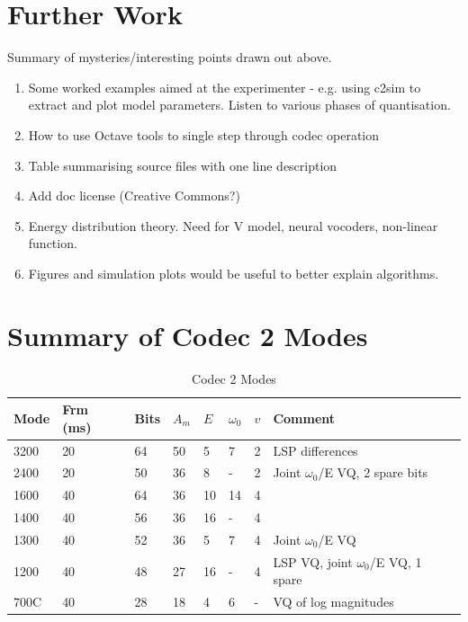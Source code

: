 \documentclass{article}
\begin{document}
\section{Further Work}

Summary of mysteries/interesting points drawn out above.

\begin{enumerate}
\item Some worked examples aimed at the experimenter - e.g. using c2sim to extract and plot model parameters.  Listen to various phases of quantisation.
\item How to use Octave tools to single step through codec operation
\item Table summarising source files with one line description
\item Add doc license (Creative Commons?)
\item Energy distribution theory.  Need for V model, neural vocoders, non-linear function.
\item Figures and simulation plots would be useful to better explain algorithms.
\end{enumerate}


\section{Summary of Codec 2 Modes}
\label{sect:glossary}

\begin{table}[H]
\label{tab:codec2_modes}
\centering
\begin{tabular}{p{0.75cm}|p{0.75cm}|p{0.5cm}|p{0.5cm}|p{0.5cm}|p{0.5cm}|p{0.5cm}|p{5cm}}
\hline
Mode & Frm (ms) & Bits & $A_m$ & $E$ & $\omega_0$ & $v$ & Comment \\
\hline
3200 & 20 & 64 & 50 & 5  & 7  & 2 & LSP differences \\
2400 & 20 & 50 & 36 & 8  & -  & 2 & Joint $\omega_0$/E VQ, 2 spare bits \\
1600 & 40 & 64 & 36 & 10 & 14 & 4 \\
1400 & 40 & 56 & 36 & 16 & -  & 4 \\
1300 & 40 & 52 & 36 & 5  & 7  & 4 & Joint $\omega_0$/E VQ \\
1200 & 40 & 48 & 27 & 16 & -  & 4 & LSP VQ, joint  $\omega_0$/E VQ, 1 spare \\
700C & 40 & 28 & 18 & 4  & 6  & - & VQ of log magnitudes \\
\hline
\end{tabular}
\caption{Codec 2 Modes}
\end{table}
\end{document}
